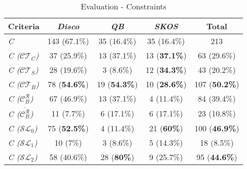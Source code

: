 \documentclass{llncs}
\begin{document}
{\begin{table}[H]
		\scriptsize
    \begin{center}
    \begin{tabular}{@{}lcccc@{}}
    \\       \textbf{Criteria}
           & \textbf{\emph{Disco}}
           & \textbf{\emph{QB}}
					 & \textbf{\emph{SKOS}}
					 & \textbf{Total}
    \\ \midrule
		\emph{C} & 143 (67.1\%) & 35 (16.4\%) & 35 (16.4\%) & 213 \\
		\hline
		\emph{C (}$\mathcal{CT}_{C}$\emph{)} & 37 (25.9\%) & 13 (37.1\%) & 13 (\textbf{37.1\%}) & 63 (29.6\%) \\
		\emph{C (}$\mathcal{CT}_{S}$\emph{)} & 28 (19.6\%) & 3 (8.6\%) & 12 (\textbf{34.3\%}) & 43 (20.2\%) \\
		\emph{C (}$\mathcal{CT}_{B}$\emph{)} & 78 (\textbf{54.6\%}) & 19 (\textbf{54.3\%}) & 10 (\textbf{28.6\%}) & 107 (\textbf{50.2\%}) \\
		\hline
		\emph{C (}$\mathcal{C}_B ^{\mathcal{R}}$\emph{)} & 67 (46.9\%) & 13 (37.1\%) & 4 (11.4\%) & 84 (39.4\%) \\
		\emph{C (}$\overline{\mathcal{C}_B ^{\mathcal{R}}}$\emph{)} & 11 (7.7\%) & 6 (17.1\%) & 6 (17.1\%) & 23 (10.8\%) \\
		\hline
		\emph{C ($\mathcal{SL}_{0}$)} & 75 (\textbf{52.5\%}) & 4 (11.4\%) & 21 (\textbf{60\%}) & 100 (\textbf{46.9\%}) \\
		\emph{C ($\mathcal{SL}_{1}$)} & 10 (7\%) & 3 (8.6\%) & 5 (14.3\%) & 18 (8.5\%) \\
		\emph{C ($\mathcal{SL}_{2}$)} & 58 (40.6\%) & 28 (\textbf{80\%}) & 9 (25.7\%) & 95 (\textbf{44.6\%}) \\
    \bottomrule
    \end{tabular}
    \caption{Evaluation - Constraints}
		\label{tab:evaluation-constraints}
    \end{center}
\end{table}
 
}
\end{document}
